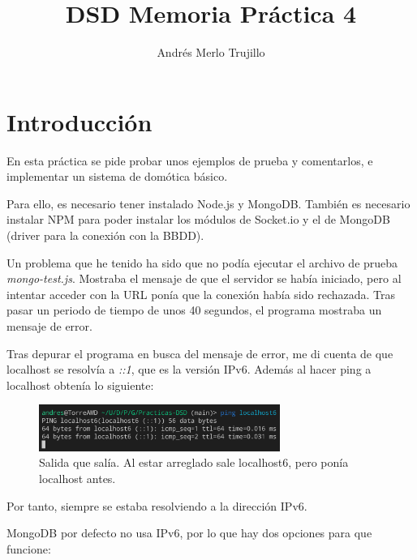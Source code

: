 \documentclass{article}
\title{DSD Memoria Práctica 4}
\author{Andrés Merlo Trujillo}
\date{}
\begin{document}

\maketitle

\tableofcontents

\newpage

\section{Introducción}
En esta práctica se pide probar unos ejemplos de prueba y comentarlos, e implementar un sistema de domótica básico.

Para ello, es necesario tener instalado Node.js y MongoDB. También es necesario instalar NPM para poder instalar los módulos de Socket.io y el de MongoDB (driver para la conexión con la BBDD).

\bigskip

Un problema que he tenido ha sido que no podía ejecutar el archivo de prueba \textit{mongo-test.js}. Mostraba el mensaje de que el servidor se había iniciado, pero al intentar acceder con la URL ponía que la conexión había sido rechazada. Tras pasar un periodo de tiempo de unos 40 segundos, el programa mostraba un mensaje de error.

Tras depurar el programa en busca del mensaje de error, me di cuenta de que localhost se resolvía a \textit{::1}, que es la versión IPv6. Además al hacer ping a localhost obtenía lo siguiente:

\begin{figure}[H]
    \centering
    \includegraphics[width=0.7\textwidth]{images/ping.png}
    \caption{Salida que salía. Al estar arreglado sale localhost6, pero ponía localhost antes.}
\end{figure}

Por tanto, siempre se estaba resolviendo a la dirección IPv6.

\bigskip

MongoDB por defecto no usa IPv6, por lo que hay dos opciones para que funcione:
\end{document}
